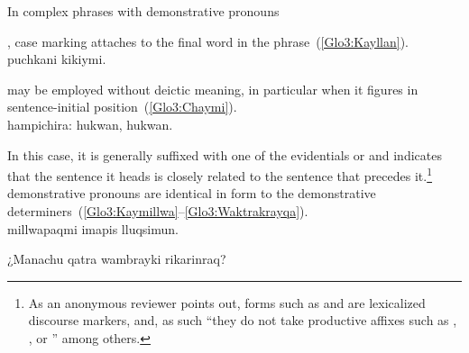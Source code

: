 \noindent
In complex phrases with demonstrative pronouns{, case marking attaches to the final word in the phrase~(\ref{Glo3:Kayllan}).\\

%
{  puchkani kikiymi.}%
{}%
{}{}%

\noindent
{} may be employed without deictic meaning, in particular when it figures in sentence-initial position~(\ref{Glo3:Chaymi}).\\

%
{ hampichira: hukwan, hukwan.}%
{}%
{}{}%

\noindent
In this case, it is generally suffixed with one of the evidentials  or  and indicates that the sentence it heads is closely related to the sentence that precedes it.\footnote{As an anonymous reviewer points out, forms such as  and  are lexicalized discourse markers, and, as such “they do not take productive affixes such as , , or ” among others.} \SYQ{} demonstrative pronouns are identical in form to the demonstrative determiners~(\ref{Glo3:Kaymillwa}--\ref{Glo3:Waktrakrayqa}).\\

%
{ millwapaqmi imapis lluqsimun.}%
{}%
{}{}%

%
{¿Manachu  qatra wambrayki rikarinraq?}%
{}%
{}{}%

}
